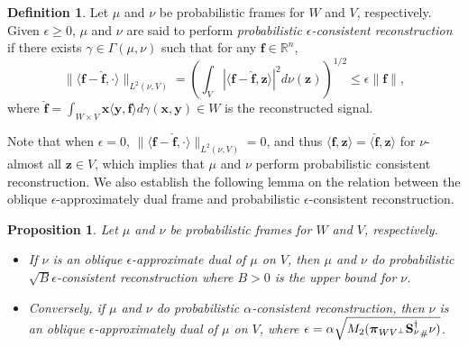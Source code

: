 \documentclass{amsart}
\numberwithin{equation}{section}
\newcommand{\bpi}{{\boldsymbol{\pi}}}
\theoremstyle{plain}
\newtheorem{proposition}[theorem]{Proposition}
\theoremstyle{remark}
\theoremstyle{definition}
\newtheorem{definition}[theorem]{Definition}
\begin{document}
\begin{definition}
  Let $\mu$ and $\nu$ be probabilistic frames for $W$ and $V$, respectively. Given $\epsilon \geq 0$, $\mu$ and $\nu$ are said to perform \emph{probabilistic $\epsilon$-consistent reconstruction} if there exists $\gamma \in \Gamma(\mu, \nu)$ such that for any $\mathbf{f} \in \mathbb{R}^n$,  
  $$
  \|\langle \mathbf{f} - \hat{\mathbf{f}},\cdot \rangle\|_{L^2(\nu, V)} = \left (\int_{V} |\langle \mathbf{f} - \hat{\mathbf{f}}, \mathbf{z} \rangle|^2 d\nu(\mathbf{z}) \right)^{1/2} \leq \epsilon \|\mathbf{f}\|,
  $$
  where $\hat{\mathbf{f}} = \int_{W \times V} \mathbf{x} \langle \mathbf{y, f} \rangle d\gamma(\mathbf{x}, \mathbf{y}) \in W$ is the reconstructed signal. 
\end{definition}
Note that when $\epsilon =0$, $\|\langle \mathbf{f} - \hat{\mathbf{f}},\cdot \rangle\|_{L^2(\nu, V)}=0$, and thus $\langle \mathbf{f}, \mathbf{z}  \rangle = \langle \hat{\mathbf{f}},  \mathbf{z} \rangle$  for $\nu$-almost all $\mathbf{z} \in V$, which implies that $\mu$ and $\nu$ perform probabilistic consistent reconstruction. We also establish the following lemma on the relation between the oblique $\epsilon$-approximately dual frame and probabilistic $\epsilon$-consistent reconstruction. 
\begin{proposition}
    Let $\mu$ and $\nu$ be probabilistic frames for $W$ and $V$, respectively.
    \begin{itemize}
        \item[$(1)$] If $\nu$ is an oblique $\epsilon$-approximate dual of $\mu$ on $V$, then $\mu$ and $\nu$ do probabilistic $\sqrt{B}\epsilon$-consistent reconstruction where $B>0$ is the upper bound for $\nu$.

        \item[$(2)$] Conversely, if $\mu$ and $\nu$ do probabilistic $\alpha$-consistent reconstruction, then $\nu$ is an oblique $\epsilon$-approximately dual of $\mu$ on $V$, where $\epsilon = \alpha \sqrt{M_2({\bpi_{WV^\perp}{\bf S}_\nu^{\dagger}}_\#\nu)} $. 
    \end{itemize}
\end{proposition}
\end{document}
